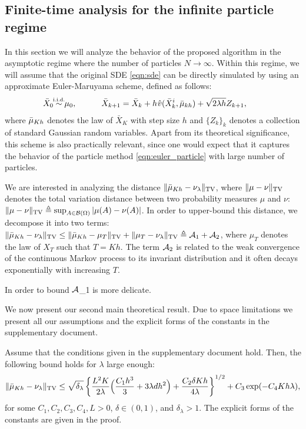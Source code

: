 
\subsection{Finite-time analysis for the infinite particle regime}



In this section we will analyze the behavior of the proposed algorithm in the asymptotic regime where the number of particles $N \rightarrow \infty$. Within this regime, we will assume that the original SDE \eqref{eqn:sde} can be directly simulated by using an approximate Euler-Maruyama scheme, defined as follows:
\begin{align}
\bar{X}_0 \simiid \mu_0, \quad \qquad \bar{X}_{k+1} = \bar{X}_k + h \hspace{0.5pt} \hat{v}(\bar{X}^i_k, \bar{\mu}_{kh} ) + \sqrt{2 \lambda h} Z_{k+1}, \qquad
\end{align}
where $\bar{\mu}_{Kh}$ denotes the law of $\bar{X}_K$ with step size $h$ and $\{Z_k\}_{k}$ denotes a collection of standard Gaussian random variables. Apart from its theoretical significance, this scheme is also practically relevant, since one would expect that it captures the behavior of the particle method \eqref{eqn:euler_particle} with large number of particles. 

We are interested in analyzing the distance $\| \bar{\mu}_{Kh} - \nu_\lambda \|_{\textnormal{TV}}$, where $\|\mu-\nu\|_{\textnormal{TV}}$ denotes the total variation distance between two probability measures $\mu$ and $\nu$: $\|\mu-\nu\|_{\textnormal{TV}}\triangleq \sup_{A \in {\cal B}(\Omega)} |\mu(A) -\nu(A) |$. 
%
In order to upper-bound this distance, we decompose it into two terms: $\| \bar{\mu}_{Kh} - \nu_\lambda \|_{\textnormal{TV}} \leq \| \bar{\mu}_{Kh} - \mu_T \|_{\textnormal{TV}} + \| \mu_{T} - \nu_\lambda \|_{\textnormal{TV}} \triangleq {\cal A}_1 + {\cal A}_2$, where $\mu_T$ denotes the law of $X_T$ such that $T=Kh$. The term ${\cal A}_2$ is related to the weak convergence of the continuous Markov process to its invariant distribution and it often decays exponentially with increasing $T$. 

In order to bound ${\cal A}$_1 is more delicate. 

We now present our second main theoretical result. Due to space limitations we present all our assumptions and the explicit forms of the constants in the supplementary document. 
\begin{thm}
\label{thm:euler}
Assume that the conditions given in the supplementary document hold. Then, the following bound holds for $\lambda$ large enough:
\begin{align}
\| \bar{\mu}_{Kh} - \nu_\lambda \|_{\textnormal{TV}} \leq \sqrt{\delta_\lambda} \left \lbrace  \frac{L^2 K}{2\lambda} \Bigl( \frac{C_1 h^3}{3} + 3 \lambda d h^2 \Bigr) + \frac{C_2  \delta K h}{4\lambda} \right \rbrace^{1/2} +  C_3 \exp(-C_4 Kh \lambda),
\end{align}
for some $C_1,C_2,C_3,C_4,L >0$, $\delta \in (0,1)$, and $\delta_\lambda >1$. The explicit forms of the constants are given in the proof.
\end{thm}




